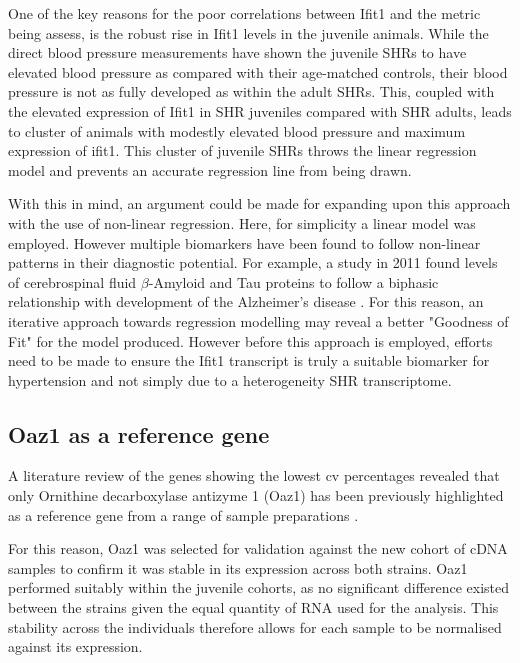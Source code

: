 One of the key reasons for the poor correlations between Ifit1 and the metric being assess, is the robust rise in Ifit1 levels in the juvenile animals. While the direct blood pressure measurements have shown the juvenile SHRs to have elevated blood pressure as compared with their age-matched controls, their blood pressure is not as fully developed as within the adult SHRs. This, coupled with the elevated expression of Ifit1 in SHR juveniles compared with SHR adults, leads to cluster of animals with modestly elevated blood pressure and maximum expression of ifit1. This cluster of juvenile SHRs throws the linear regression model and prevents an accurate regression line from being drawn. 

With this in mind, an argument could be made for expanding upon this approach with the use of non-linear regression. Here, for simplicity a linear model was employed. However multiple biomarkers have been found to follow non-linear patterns in their diagnostic potential. For example, a study in 2011 found levels of cerebrospinal fluid $\beta$-Amyloid and Tau proteins to follow a biphasic relationship with development of the Alzheimer's disease \cite{Williams2011}. For this reason, an iterative approach towards regression modelling may reveal a better "Goodness of Fit" for the model produced. However before this approach is employed, efforts need to be made to ensure the Ifit1 transcript is truly a suitable biomarker for hypertension and not simply due to a heterogeneity SHR transcriptome. 

\subsection{Oaz1 as a reference gene}

A literature review of the genes showing the lowest \acrshort{cv} percentages revealed that only Ornithine decarboxylase antizyme 1 (Oaz1) has been previously highlighted as a reference gene from a range of sample preparations \cite{10.1371/journal.pone.0006162,DeJonge2007}. 

For this reason, Oaz1 was selected for validation against the new cohort of cDNA samples to confirm it was stable in its expression across both strains. Oaz1 performed suitably within the juvenile cohorts, as no significant difference existed between the strains given the equal quantity of RNA used for the analysis. This stability across the individuals therefore allows for each sample to be normalised against its expression. 

